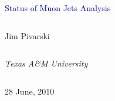 \documentclass[compress]{beamer}
\begin{document}
\begin{frame}
\vfill
\begin{center}
\textcolor{darkblue}{\Large Status of Muon Jets Analysis}

\vfill
\begin{columns}
\begin{center}
\large
Jim Pivarski
\end{center}
\end{columns}

\begin{columns}
\begin{center}
\scriptsize
{\it Texas A\&M University}
\end{center}
\end{columns}

\vfill
28 June, 2010

\end{center}
\end{frame}


\small
\end{document}

